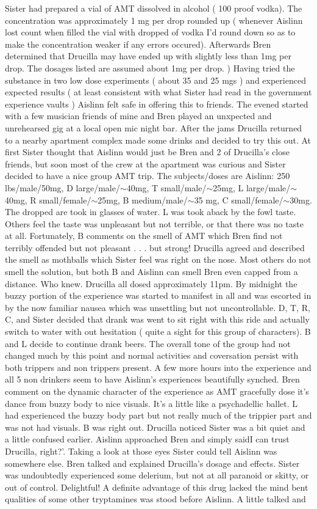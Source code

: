 \documentclass[12pt]{book}
\begin{document}
Sister had prepared a vial of AMT dissolved in alcohol ( 100 proof vodka). The concentration was approximately 1 mg per drop rounded up ( whenever Aislinn lost count when filled the vial with dropped of vodka I'd round down so as to make the concentration weaker if any errors occured). Afterwards Bren determined that Drucilla may have ended up with slightly less than 1mg per drop. The dosages listed are assumed about 1mg per drop. ) Having tried the substance in two low dose experiments ( about 35 and 25 mgs ) and experienced expected results ( at least consistent with what Sister had read in the government experience vaults ) Aislinn felt safe in offering this to friends. The evened started with a few musician friends of mine and Bren played an unxpected and unrehearsed gig at a local open mic night bar. After the jams Drucilla returned to a nearby apartment complex made some drinks and decided to try this out. At first Sister thought that Aislinn would just be Bren and 2 of Drucilla's close friends, but soon most of the crew at the apartment was curious and Sister decided to have a nice group AMT trip. The subjects/doses are Aislinn: 250 lbs/male/50mg, D large/male/$\sim$40mg, T small/male/$\sim$25mg, L large/male/$\sim$40mg, R small/female/$\sim$25mg, B medium/male/$\sim$35 mg, C small/female/$\sim$30mg. The dropped are took in glasses of water. L was took aback by the fowl taste. Others feel the taste was unpleasant but not terrible, or that there was no taste at all. Fortunately, B comments on the smell of AMT which Bren find not terribly offended but not pleasant . . .  but strong! Drucilla agreed and described the smell as mothballs which Sister feel was right on the nose. Most others do not smell the solution, but both B and Aislinn can smell Bren even capped from a distance. Who knew. Drucilla all dosed approximately 11pm. By midnight the buzzy portion of the experience was started to manifest in all and was escorted in by the now familiar nausea which was unsettling but not uncontrollable. D, T, R, C, and Sister decided that drank was went to sit right with this ride and actually switch to water with out hesitation ( quite a sight for this group of characters). B and L decide to continue drank beers. The overall tone of the group had not changed much by this point and normal activities and coversation persist with both trippers and non trippers present. A few more hours into the experience and all 5 non drinkers seem to have Aislinn's experiences beautifully synched. Bren comment on the dynamic character of the experience as AMT gracefully dose it's dance from buzzy body to nice visuals. It's a little like a psychadellic ballet. L had experienced the buzzy body part but not really much of the trippier part and was not had visuals. B was right out. Drucilla noticed Sister was a bit quiet and a little confused earlier. Aislinn approached Bren and simply saidI can trust Drucilla, right?'. Taking a look at those eyes Sister could tell Aislinn was somewhere else. Bren talked and explained Drucilla's dosage and effects. Sister was undoubtedly experienced some delerium, but not at all paranoid or skitty, or out of control. Delightful! A definite advantage of this drug lacked the mind bent qualities of some other tryptamines was stood before Aislinn. A little talked and 
\end{document}
